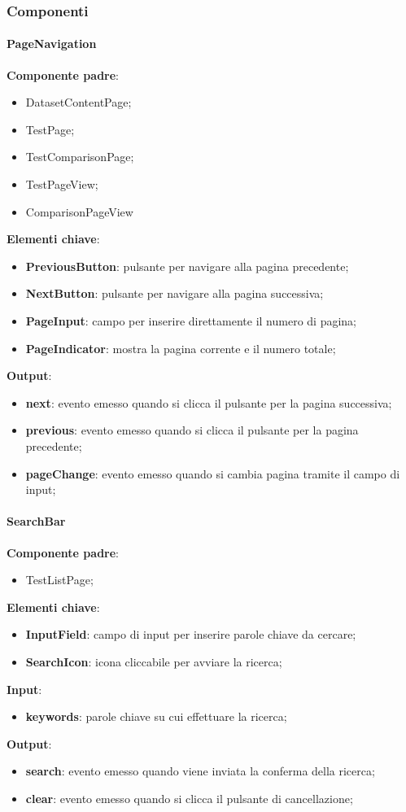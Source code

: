 \subsubsection{Componenti}
\label{sec:Componenti}
\paragraph{PageNavigation}
\textbf{Componente padre}:
\begin{itemize}
    \item DatasetContentPage;
    \item TestPage;
    \item TestComparisonPage;
    \item TestPageView;
    \item ComparisonPageView
\end{itemize}
\textbf{Elementi chiave}:
\begin{itemize}
    \item \textbf{PreviousButton}: pulsante per navigare alla pagina precedente;
    \item \textbf{NextButton}: pulsante per navigare alla pagina successiva;
    \item \textbf{PageInput}: campo per inserire direttamente il numero di pagina;
    \item \textbf{PageIndicator}: mostra la pagina corrente e il numero totale;
\end{itemize}
\textbf{Output}:
\begin{itemize}
    \item \textbf{next}: evento emesso quando si clicca il pulsante per la pagina successiva;
    \item \textbf{previous}: evento emesso quando si clicca il pulsante per la pagina precedente;
    \item \textbf{pageChange}: evento emesso quando si cambia pagina tramite il campo di input;
\end{itemize}
\paragraph{SearchBar}
\textbf{Componente padre}:
\begin{itemize}
    \item TestListPage;
\end{itemize}
\textbf{Elementi chiave}:
\begin{itemize}
    \item \textbf{InputField}: campo di input per inserire parole chiave da cercare;
    \item \textbf{SearchIcon}: icona cliccabile per avviare la ricerca;
\end{itemize}
\textbf{Input}:
\begin{itemize}
    \item \textbf{keywords}: parole chiave su cui effettuare la ricerca;
\end{itemize}
\textbf{Output}:
\begin{itemize}
    \item \textbf{search}: evento emesso quando viene inviata la conferma della ricerca;
    \item \textbf{clear}: evento emesso quando si clicca il pulsante di cancellazione;
\end{itemize} 
